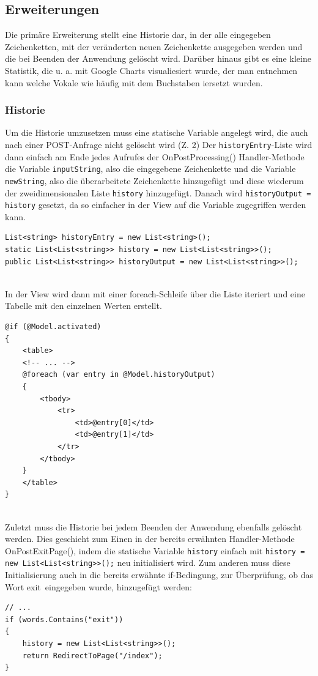 \documentclass[a4paper,
12pt,
oneside]
{article}
\begin{document}
	
	
	
	\subsection{Erweiterungen}
	Die primäre Erweiterung stellt eine Historie dar, in der alle eingegeben Zeichenketten, mit der veränderten neuen Zeichenkette ausgegeben werden und die bei Beenden der Anwendung gelöscht wird. Darüber hinaus gibt es eine kleine Statistik, die u. a. mit Google Charts visualiesiert wurde, der man entnehmen kann welche Vokale wie häufig mit dem Buchstaben \glqq i\grqq ersetzt wurden.
	
	\subsubsection{Historie}
	Um die Historie umzusetzen muss eine statische Variable angelegt wird, die auch nach einer POST-Anfrage nicht gelöscht wird (Z. 2) Der \texttt{historyEntry}-Liste wird dann einfach am Ende jedes Aufrufes der OnPostProcessing() Handler-Methode die Variable \texttt{inputString}, also die eingegebene Zeichenkette und die Variable \texttt{newString}, also die überarbeitete Zeichenkette hinzugefügt und diese wiederum der zweidimensionalen Liste \texttt{history} hinzugefügt. Danach wird \texttt{historyOutput = history} gesetzt, da so einfacher in der View auf die Variable zugegriffen werden kann.
	\lstset{style=csharp}
	\begin{lstlisting}
List<string> historyEntry = new List<string>();
static List<List<string>> history = new List<List<string>>();
public List<List<string>> historyOutput = new List<List<string>>();
	\end{lstlisting} ~\\
	In der View wird dann mit einer foreach-Schleife über die Liste iteriert und eine Tabelle mit den einzelnen Werten erstellt.
	 \lstset{style=cshtml}
	 \begin{lstlisting}
@if (@Model.activated)
{
	<table>
	<!-- ... -->
	@foreach (var entry in @Model.historyOutput)
	{
		<tbody>
			<tr>
				<td>@entry[0]</td>
				<td>@entry[1]</td>
			</tr>
		</tbody>
	}
	</table>
}
	 \end{lstlisting} ~\\
	 Zuletzt muss die Historie bei jedem Beenden der Anwendung ebenfalls gelöscht werden. Dies geschieht zum Einen in der bereits erwähnten Handler-Methode OnPostExitPage(), indem die statische Variable \texttt{history} einfach mit \texttt{history = new List<List<string>>();} neu initialisiert wird. Zum anderen muss diese Initialisierung auch in die bereits erwähnte if-Bedingung, zur Überprüfung, ob das Wort \glqq exit\grqq~eingegeben wurde, hinzugefügt werden:
	 \lstset{style=csharp}
	 \begin{lstlisting}
// ...
if (words.Contains("exit"))
{
	history = new List<List<string>>();
	return RedirectToPage("/index");
}
	 \end{lstlisting}
	 
\end{document}
